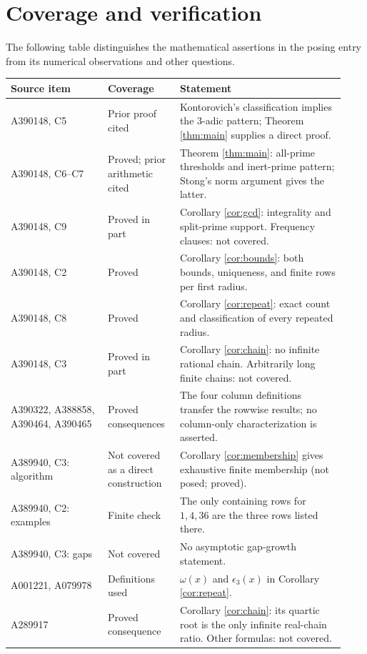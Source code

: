 \documentclass[11pt]{article}
\begin{document}
\section{Coverage and verification}
The following table distinguishes the mathematical assertions in the posing
entry from its numerical observations and other questions.
\begin{longtable}{@{}>{\raggedright\arraybackslash}p{0.27\linewidth}>{\raggedright\arraybackslash}p{0.20\linewidth}>{\raggedright\arraybackslash}p{0.46\linewidth}@{}}
\toprule
Source item & Coverage & Statement\\
\midrule
\endhead
A390148, C5 & Prior proof cited & Kontorovich's classification implies the $3$-adic pattern; Theorem \ref{thm:main} supplies a direct proof.\\[3pt]
A390148, C6--C7 & Proved; prior arithmetic cited & Theorem \ref{thm:main}: all-prime thresholds and inert-prime pattern; Stong's norm argument gives the latter.\\[3pt]
A390148, C9 & Proved in part & Corollary \ref{cor:gcd}: integrality and split-prime support. Frequency clauses: not covered.\\[3pt]
A390148, C2 & Proved & Corollary \ref{cor:bounds}: both bounds, uniqueness, and finite rows per first radius.\\[3pt]
A390148, C8 & Proved & Corollary \ref{cor:repeat}: exact count and classification of every repeated radius.\\[3pt]
A390148, C3 & Proved in part & Corollary \ref{cor:chain}: no infinite rational chain. Arbitrarily long finite chains: not covered.\\[3pt]
A390322, A388858, A390464, A390465 & Proved consequences & The four column definitions transfer the rowwise results; no column-only characterization is asserted.\\[3pt]
A389940, C3: algorithm & Not covered as a direct construction & Corollary \ref{cor:membership} gives exhaustive finite membership (not posed; proved).\\[3pt]
A389940, C2: examples & Finite check & The only containing rows for $1,4,36$ are the three rows listed there.\\[3pt]
A389940, C3: gaps & Not covered & No asymptotic gap-growth statement.\\[3pt]
A001221, A079978 & Definitions used & $\omega(x)$ and $\epsilon_3(x)$ in Corollary \ref{cor:repeat}.\\[3pt]
A289917 & Proved consequence & Corollary \ref{cor:chain}: its quartic root is the only infinite real-chain ratio. Other formulas: not covered.\\[3pt]

\end{longtable}
\end{document}
